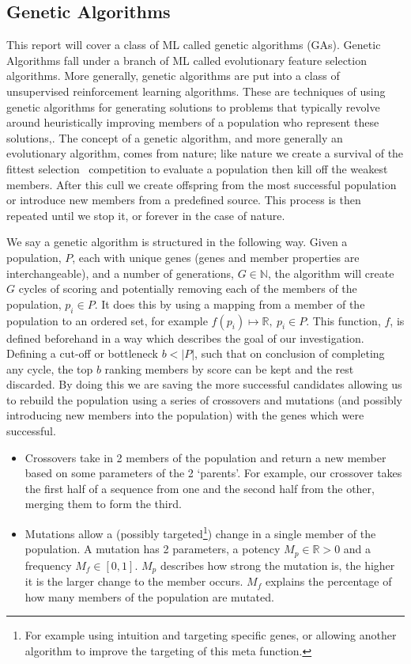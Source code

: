 \subsection{Genetic Algorithms}\label{subsec:geneticAlgorithms}
This report will cover a class of ML called genetic algorithms (GAs).
Genetic Algorithms fall under a branch of ML called evolutionary feature selection algorithms.
More generally, genetic algorithms are put into a class of unsupervised reinforcement learning algorithms.
These are techniques of using genetic algorithms for generating solutions to problems that typically revolve around heuristically improving members of a population who represent these solutions,\cite{horn1994niched,rahmat1999electromagnetic}.
The concept of a genetic algorithm, and more generally an evolutionary algorithm, comes from nature;
like nature we create a survival of the fittest selection~\cite{darwin2009origin} competition to evaluate a population then kill off the weakest members.
After this cull we create offspring from the most successful population or introduce new members from a predefined source.
This process is then repeated until we stop it, or forever in the case of nature.

We say a genetic algorithm is structured in the following way.
Given a population, \(P\), each with unique genes (genes and member properties are interchangeable), and a number of generations, \(G\in \mathbb{N}\), the algorithm will create \(G\) cycles of scoring and potentially removing each of the members of the population, \(p_i \in P\).
It does this by using a mapping from a member of the population to an ordered set, for example \(f(p_i)\mapsto \mathbb{R},\ p_i \in P\).
This function, \(f\), is defined beforehand in a way which describes the goal of our investigation.
Defining a cut-off or bottleneck \(b<|P|\), such that on conclusion of completing any cycle, the top \(b\) ranking members by score can be kept and the rest discarded.
By doing this we are saving the more successful candidates allowing us to rebuild the population using a series of crossovers and mutations (and possibly introducing new members into the population) with the genes which were successful.

\begin{itemize}
    \item Crossovers take in 2 members of the population and return a new member based on some parameters of the 2 `parents'.
    For example, our crossover takes the first half of a sequence from one and the second half from the other, merging them to form the third.
    \item Mutations allow a (possibly targeted\footnote{For example using intuition and targeting specific genes, or allowing another algorithm to improve the targeting of this meta function.}) change in a single member of the population.
    A mutation has 2 parameters, a potency \(M_p\in \mathbb{R}>0\) and a frequency \(M_f\in [0,1]\).
    \(M_p\) describes how strong the mutation is, the higher it is the larger change to the member occurs.
    \(M_f\) explains the percentage of how many members of the population are mutated.
\end{itemize}

